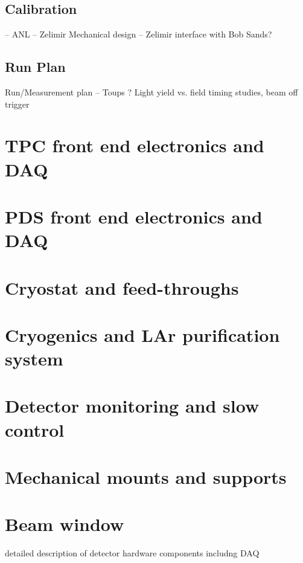 \subsection{Calibration} -- ANL -- Zelimir
     Mechanical design -- Zelimir interface with Bob Sands?
\subsection{Run Plan}
     Run/Measurement plan  -- Toups ?
     Light yield vs. field
     timing studies,
     beam off trigger



\section{TPC front end electronics and DAQ}

\section{PDS front end electronics and DAQ}

\section{Cryostat and feed-throughs}

\section{Cryogenics and LAr purification system}

\section{Detector monitoring and slow control}

\section{Mechanical mounts and supports}

\section{Beam window}

detailed description of detector hardware components includng DAQ

